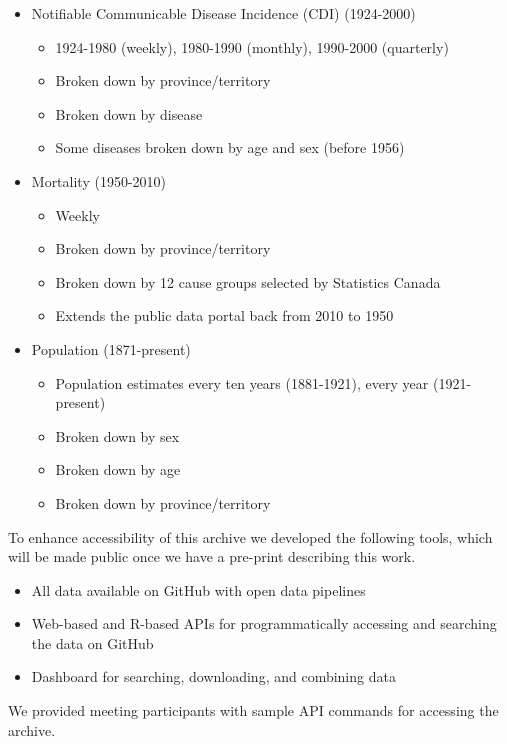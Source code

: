\documentclass{article}
\begin{document}
\begin{itemize}
  \item Notifiable Communicable Disease Incidence (CDI) (1924-2000)
    \begin{itemize}
      \item 1924-1980 (weekly), 1980-1990 (monthly), 1990-2000 (quarterly)
      \item Broken down by province/territory
      \item Broken down by disease
      \item Some diseases broken down by age and sex (before 1956)
    \end{itemize}
  \item Mortality (1950-2010)
    \begin{itemize}
      \item Weekly
      \item Broken down by province/territory
      \item Broken down by 12 cause groups selected by Statistics Canada
      \item Extends the public data portal back from 2010 to 1950
    \end{itemize}
  \item Population (1871-present)
    \begin{itemize}
      \item Population estimates every ten years (1881-1921), every year (1921-present)
      \item Broken down by sex
      \item Broken down by age
      \item Broken down by province/territory
    \end{itemize}
\end{itemize}

To enhance accessibility of this archive we developed the following tools, which will be made public once we have a pre-print describing this work.

\begin{itemize}
  \item All data available on GitHub with open data pipelines
  \item Web-based and R-based APIs for programmatically accessing and searching the data on GitHub
  \item Dashboard for searching, downloading, and combining data
\end{itemize}

We provided meeting participants with sample API commands for accessing the archive.
\end{document}
